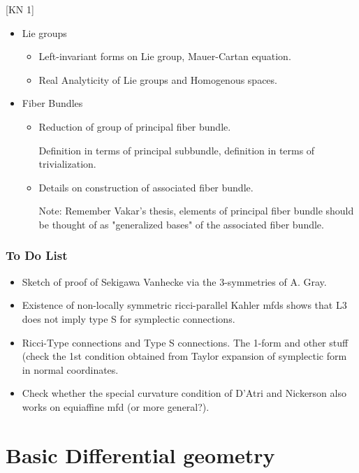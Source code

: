 \documentclass{report}
\theoremstyle{definition}
\begin{document}
[KN 1]

\begin{itemize}
    \item Lie groups
    \begin{itemize}
        \item Left-invariant forms on Lie group, Mauer-Cartan equation.
        \item Real Analyticity of Lie groups and Homogenous spaces.
    \end{itemize}
    \item Fiber Bundles
    \begin{itemize}
        \item Reduction of group of principal fiber bundle.

        Definition in terms of principal subbundle, definition in terms of trivialization.
        \item Details on construction of associated fiber bundle.

        Note: Remember Vakar's thesis, elements of principal fiber bundle should be thought of as "generalized bases" of the associated fiber bundle.
    \end{itemize}
\end{itemize}

\section{To Do List}

\begin{itemize}
    \item Sketch of proof of Sekigawa Vanhecke via the 3-symmetries of A. Gray.
    \item Existence of non-locally symmetric ricci-parallel Kahler mfds shows that L3 does not imply type S for symplectic connections.
    \item Ricci-Type connections and Type S connections. The 1-form and other stuff (check the 1st condition obtained from Taylor expansion of symplectic form in normal coordinates.
    \item Check whether the special curvature condition of D'Atri and Nickerson also works on equiaffine mfd (or more general?).
\end{itemize}

\part{Basic Differential geometry}
\end{document}
